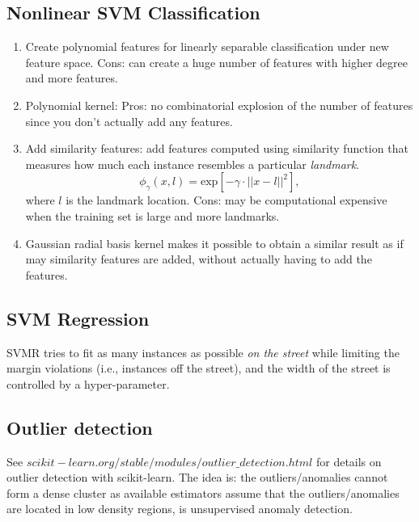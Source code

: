 \documentclass[12pt,oneside,a4paper]{article}
\numberwithin{equation}{section}
\begin{document}
\subsection{Nonlinear SVM Classification}

\begin{enumerate}
\item Create polynomial features for linearly separable classification under new feature space. Cons: can create a huge number of features with higher degree and more features. 
\item Polynomial kernel:  Pros: no combinatorial explosion of the number of features since you don't actually add any features.

\item Add similarity features: add features computed using similarity function that measures how much each instance resembles a particular \emph{landmark}.
\begin{equation}
\phi_\gamma (x, l) = \textrm{exp}\left[-\gamma \cdot ||x - l||^2\right],
\end{equation}
where $l$ is the landmark location. Cons: may be computational expensive when the training set is large and more landmarks.

\item Gaussian radial basis kernel makes it possible to obtain a similar result as if may similarity features are added, without actually having to add the features. 
\end{enumerate}
\subsection{SVM Regression}

SVMR tries to fit as many instances as possible \emph{on the street} while limiting the margin violations (i.e., instances off the street), and the width of the street is controlled by a hyper-parameter. 

\subsection{Outlier detection}
See \href{https://scikit-learn.org/stable/modules/outlier_detection.html}{$scikit-learn.org/stable/modules/outlier\_detection.html$} for details on outlier detection with scikit-learn. The idea is: the outliers/anomalies cannot form a dense cluster as available estimators assume that the outliers/anomalies are located in low density regions, is unsupervised anomaly detection.
\end{document}
